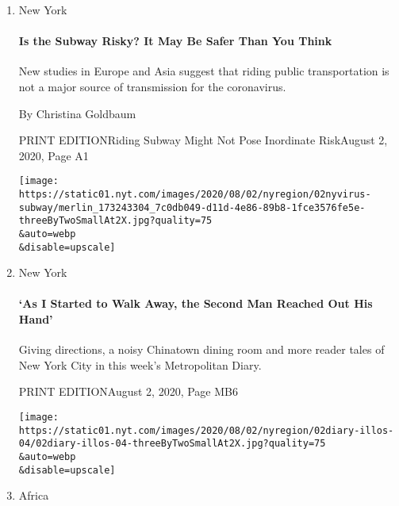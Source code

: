 \begin{enumerate}
\def\labelenumi{\arabic{enumi}.}
\item
  New York

  \href{/2020/08/02/nyregion/nyc-subway-coronavirus-safety.html?searchResultPosition=1}{}

  \hypertarget{is-the-subway-risky-it-may-be-safer-than-you-think}{%
  \paragraph{Is the Subway Risky? It May Be Safer Than You
  Think}\label{is-the-subway-risky-it-may-be-safer-than-you-think}}

  New studies in Europe and Asia suggest that riding public
  transportation is not a major source of transmission for the
  coronavirus.

  By Christina Goldbaum

  PRINT EDITIONRiding Subway Might Not Pose Inordinate
  Risk\textbar{}August 2, 2020, Page A1

  \texttt{[image: https://static01.nyt.com/images/2020/08/02/nyregion/02nyvirus-subway/merlin\_173243304\_7c0db049-d11d-4e86-89b8-1fce3576fe5e-threeByTwoSmallAt2X.jpg?quality=75\\\&auto=webp\\\&disable=upscale]}
\item
  New York

  \href{/2020/08/02/nyregion/metropolitan-diary.html?searchResultPosition=2}{}

  \hypertarget{as-i-started-to-walk-away-the-second-man-reached-out-his-hand}{%
  \paragraph{`As I Started to Walk Away, the Second Man Reached Out His
  Hand'}\label{as-i-started-to-walk-away-the-second-man-reached-out-his-hand}}

  Giving directions, a noisy Chinatown dining room and more reader tales
  of New York City in this week's Metropolitan Diary.

  PRINT EDITIONAugust 2, 2020, Page MB6

  \texttt{[image: https://static01.nyt.com/images/2020/08/02/nyregion/02diary-illos-04/02diary-illos-04-threeByTwoSmallAt2X.jpg?quality=75\\\&auto=webp\\\&disable=upscale]}
\item
  Africa

  \href{/aponline/2020/08/02/world/africa/ap-af-virus-outbreak-toxic-stigma.html?searchResultPosition=3}{}


\end{enumerate}
